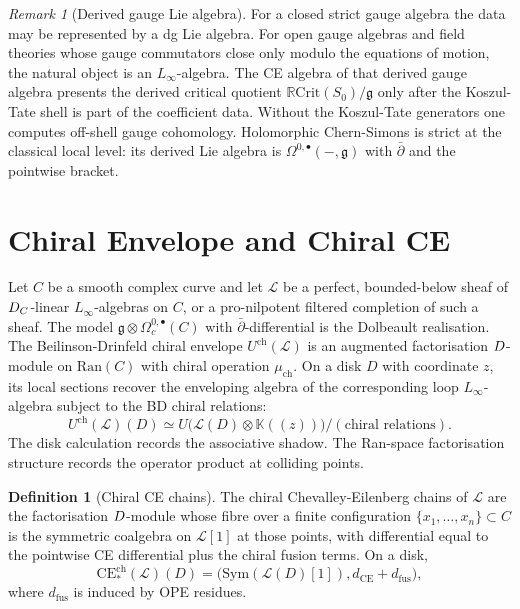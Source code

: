 \documentclass[11pt]{amsart}
\providecommand{\KK}{\mathbb{K}}
\providecommand{\dbar}{\bar{\partial}}
\providecommand{\gfrak}{\mathfrak{g}}
\providecommand{\CE}{\mathrm{CE}}
\providecommand{\chCE}{\mathrm{CE}^{\mathrm{ch}}}
\providecommand{\cL}{\mathcal{L}}
\providecommand{\Sym}{\mathrm{Sym}}
\providecommand{\Ran}{\mathrm{Ran}}
\providecommand{\Uch}{U^{\mathrm{ch}}}
\theoremstyle{plain}
\theoremstyle{definition}
\newtheorem{definition}[theorem]{Definition}
\theoremstyle{remark}
\newtheorem{remark}[theorem]{Remark}
\begin{document}
\begin{remark}[Derived gauge Lie algebra]
\label{rmk:derivedlie}
For a closed strict gauge algebra the data may be represented by a dg
Lie algebra.  For open gauge algebras and field theories whose gauge
commutators close only modulo the equations of motion, the natural
object is an $L_\infty$-algebra.  The CE algebra of that derived gauge
algebra presents the derived critical quotient
$\mathbb{R}\mathrm{Crit}(S_0)/\gfrak$ only after the Koszul-Tate shell
is part of the coefficient data.  Without the Koszul-Tate generators
one computes off-shell gauge cohomology.  Holomorphic Chern-Simons is
strict at the classical local level: its derived Lie algebra is
$\Omega^{0,\bullet}(-,\gfrak)$ with $\dbar$ and the pointwise bracket.
\end{remark}

\section{Chiral Envelope and Chiral CE}
\label{sec:chiral}

Let $C$ be a smooth complex curve and let $\cL$ be a perfect,
bounded-below sheaf of $D_C$-linear $L_\infty$-algebras on $C$, or a
pro-nilpotent filtered completion of such a sheaf.  The model
$\gfrak\otimes\Omega^{0,\bullet}_c(C)$ with $\dbar$-differential is the
Dolbeault realisation.  The Beilinson-Drinfeld chiral envelope
$\Uch(\cL)$ is an augmented factorisation $D$-module on $\Ran(C)$ with
chiral operation $\mu_{\mathrm{ch}}$.  On a disk $D$ with coordinate
$z$, its local sections recover the enveloping algebra of the
corresponding loop $L_\infty$-algebra subject to the BD chiral
relations:
\[
  \Uch(\cL)(D)
  \simeq
  U\bigl(\cL(D)\otimes\KK(\!(z)\!)\bigr)/(\text{chiral relations}).
\]
The disk calculation records the associative shadow.  The Ran-space
factorisation structure records the operator product at colliding
points.

\begin{definition}[Chiral CE chains]
\label{def:chce}
The chiral Chevalley-Eilenberg chains of $\cL$ are the factorisation
$D$-module whose fibre over a finite configuration
$\{x_1,\ldots,x_n\}\subset C$ is the symmetric coalgebra on
$\cL[1]$ at those points, with differential equal to the pointwise CE
differential plus the chiral fusion terms.  On a disk,
\[
  \chCE_*(\cL)(D)
  =
  \bigl(\Sym(\cL(D)[1]),d_\CE+d_{\mathrm{fus}}\bigr),
\]
where $d_{\mathrm{fus}}$ is induced by OPE residues.
\end{definition}
\end{document}
